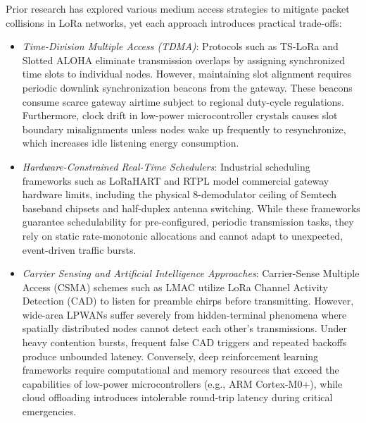 \documentclass[preprint,review,12pt]{elsarticle}
\begin{document}
Prior research has explored various medium access strategies to mitigate packet collisions in LoRa networks, yet each approach introduces practical trade-offs:

\begin{itemize}

    \item \textit{Time-Division Multiple Access (TDMA)}: Protocols such as TS-LoRa \cite{zorbas2020tslora} and Slotted ALOHA \cite{polonelli2019slotted} eliminate transmission overlaps by assigning synchronized time slots to individual nodes. However, maintaining slot alignment requires periodic downlink synchronization beacons from the gateway. These beacons consume scarce gateway airtime subject to regional duty-cycle regulations. Furthermore, clock drift in low-power microcontroller crystals causes slot boundary misalignments unless nodes wake up frequently to resynchronize, which increases idle listening energy consumption.

    \item \textit{Hardware-Constrained Real-Time Schedulers}: Industrial scheduling frameworks such as LoRaHART \cite{sahoo2025lorahart} and RTPL \cite{fahmida2024rtpl} model commercial gateway hardware limits, including the physical 8-demodulator ceiling of Semtech baseband chipsets and half-duplex antenna switching. While these frameworks guarantee schedulability for pre-configured, periodic transmission tasks, they rely on static rate-monotonic allocations and cannot adapt to unexpected, event-driven traffic bursts.

    \item \textit{Carrier Sensing and Artificial Intelligence Approaches}: Carrier-Sense Multiple Access (CSMA) schemes such as LMAC \cite{gamage2023lmac} utilize LoRa Channel Activity Detection (CAD) to listen for preamble chirps before transmitting. However, wide-area LPWANs suffer severely from hidden-terminal phenomena where spatially distributed nodes cannot detect each other's transmissions. Under heavy contention bursts, frequent false CAD triggers and repeated backoffs produce unbounded latency. Conversely, deep reinforcement learning frameworks \cite{leonardi2025deepadr} require computational and memory resources that exceed the capabilities of low-power microcontrollers (e.g., ARM Cortex-M0+), while cloud offloading introduces intolerable round-trip latency during critical emergencies.
\end{itemize}
\end{document}
